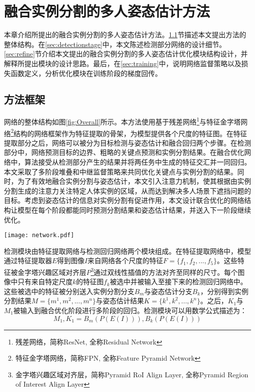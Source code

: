 \chapter{融合实例分割的多人姿态估计方法}
\label{cha:method}
本章介绍所提出的融合实例分割的多人姿态估计方法。\ref{sec:methodoverview}节描述本文提出方法的整体结构。在\ref{sec:detectionstage}中，本文陈述检测部分网络的设计细节。\ref{sec:refine}节介绍本文提出的融合实例分割的多人姿态估计优化模块结构设计，并解释所提出模块的设计思路。最后，在\ref{sec:training}中，说明网络监督策略以及损失函数定义，分析优化模块在训练阶段的梯度回传。

\section{方法框架}
\label{sec:methodoverview}
网络的整体结构如图\ref{fig:Overall}所示。本方法使用基于残差网络\footnote{残差网络，简称ResNet, 全称Residual Network}与特征金字塔网络\footnote{特征金字塔网络，简称FPN, 全称Feature Pyramid Network}结构的网络框架作为特征提取的骨架，为模型提供各个尺度的特征图。在特征提取部分之后，网络可以被分为目标检测与姿态估计和融合回归两个步骤。在检测部分中，网络预测目标的边界、粗略的关键点预测和实例分割结果。在融合优化网络中，算法接受从检测部分产生的结果并将两任务中生成的特征交汇并一同回归。本文采取了多阶段堆叠和中继监督策略来共同优化关键点与实例分割的结果。同时，为了有效地融合实例分割与姿态估计，本文引入注意力机制，使其根据由实例分割生成的注意力关注特定人体实例的区域，从而达到解决多人场景下遮挡问题的目标。考虑到姿态估计的信息对实例分割有促进作用，本文设计联合优化的网络结构让模型在每个阶段都能同时预测分割结果和姿态估计结果，并送入下一阶段继续优化。

\begin{figure*}[htbp]	
	\centering
	\texttt{[image: network.pdf]}
	\caption{网络整体结构}
	\label{fig:Overall}
\end{figure*}

检测模块由特征提取网络与检测回归网络两个模块组成。在特征提取网络中，模型通过特征提取器$E$得到图像$I$来自网络各个尺度的特征$F=\{f_1, f_2, ..., f_5\}$。这些特征被金字塔兴趣区域对齐层$P$\footnote{金字塔兴趣区域对齐层，简称Pyramid RoI Align Layer, 全称Pyramid Region of Interest Align Layer}通过双线性插值的方法对齐至同样的尺寸。每个图像中只有来自特定尺度$k$的特征图$f_k$被选中并被输入至接下来的检测回归网络中。这些被选中的特征被分别送入实例分割分支$B_m$与姿态估计分支$B_k$，分别得到实例分割结果$M=\{m^1, m^2, ..., m^n\}$与姿态估计结果$K=\{k^1, k^2, ..., k^n\}$。之后，$K_1$与$M_1$被输入到融合优化阶段进行多阶段的回归。检测模块可以用数学公式描述为：
\begin{equation}
\label{def:detectnet}
M_1, K_1 = B_m(P(E(I))), B_k(P(E(I)))
\end{equation}

